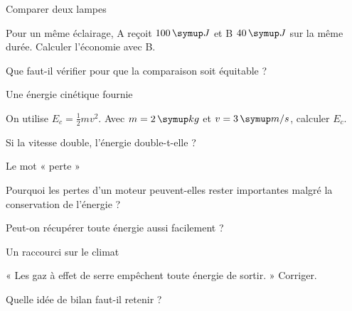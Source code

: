 \clearpage{}
\par\noindent\begin{minipage}{\linewidth}
\begin{exercice}[3]{Comparer deux lampes}
\begin{questions}
\item Pour un même éclairage, A reçoit $100\unite J$ et B $40\unite J$ sur la même durée. Calculer l’économie avec B.
\item Que faut-il vérifier pour que la comparaison soit équitable ?
\end{questions}
\end{exercice}
\end{minipage}
\par\noindent\begin{minipage}{\linewidth}
\begin{exercice}[3]{Une énergie cinétique fournie}
\begin{questions}
\item On utilise $E_c=\frac12mv^2$. Avec $m=2\unite{kg}$ et $v=3\unite{m/s}$, calculer $E_c$.
\item Si la vitesse double, l’énergie double-t-elle ?
\end{questions}
\end{exercice}
\end{minipage}
\par\noindent\begin{minipage}{\linewidth}
\begin{exercice}[3]{Le mot « perte »}
\begin{questions}
\item Pourquoi les pertes d’un moteur peuvent-elles rester importantes malgré la conservation de l’énergie ?
\item Peut-on récupérer toute énergie aussi facilement ?
\end{questions}
\end{exercice}
\end{minipage}
\par\noindent\begin{minipage}{\linewidth}
\begin{exercice}[3]{Un raccourci sur le climat}
\begin{questions}
\item « Les gaz à effet de serre empêchent toute énergie de sortir. » Corriger.
\item Quelle idée de bilan faut-il retenir ?
\end{questions}
\end{exercice}
\end{minipage}

